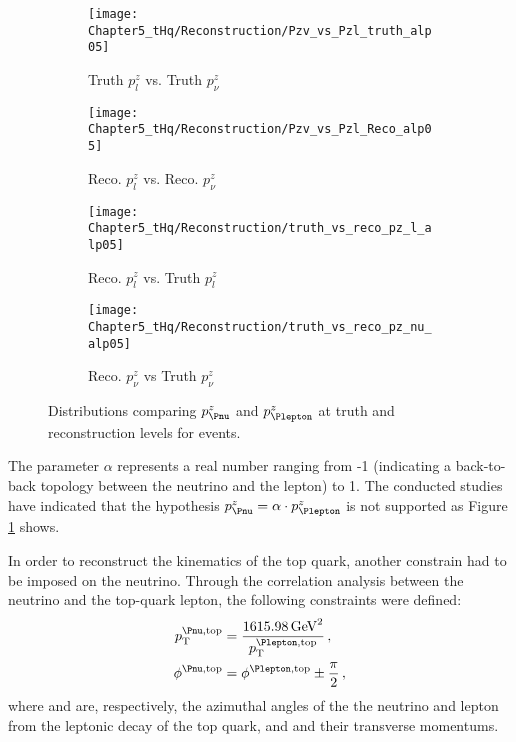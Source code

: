 \begin{figure}  
	\begin{subfigure}{0.45\textwidth}
	\texttt{[image: Chapter5\_tHq/Reconstruction/Pzv\_vs\_Pzl\_truth\_alp05]}
	\caption{Truth $p^z_l$ vs. Truth $p^z_\nu$}
	\label{fig:tHq:EventReconstruction:TopSystem:hypothesis1:A}
	\end{subfigure}
\hfill 
	\begin{subfigure}{0.45\textwidth}
	\texttt{[image: Chapter5\_tHq/Reconstruction/Pzv\_vs\_Pzl\_Reco\_alp05]}
	\caption{Reco. $p^z_l$ vs. Reco. $p^z_\nu$}
	\label{fig:tHq:EventReconstruction:TopSystem:hypothesis1:B	}
	\end{subfigure}

\bigskip  
	\begin{subfigure}{0.45\textwidth}
	\texttt{[image: Chapter5\_tHq/Reconstruction/truth\_vs\_reco\_pz\_l\_alp05]}
	\caption{Reco. $p^z_l$ vs. Truth $p^z_l$}
	\label{fig:tHq:EventReconstruction:TopSystem:hypothesis1:C}
	\end{subfigure}
\hfill 
	\begin{subfigure}{0.45\textwidth}
	\texttt{[image: Chapter5\_tHq/Reconstruction/truth\_vs\_reco\_pz\_nu\_alp05]}
	\caption{Reco. $p^z_\nu$ vs Truth $p^z_\nu$}
	\label{fig:tHq:EventReconstruction:TopSystem:hypothesis1:D}
	\end{subfigure}

\caption{Distributions comparing $p^{z}_{\Pnu}$ and $p^{z}_{\Plepton}$
at truth and reconstruction levels for \tHq \dileptau events.} %
\label{fig:tHq:EventReconstruction:TopSystem:hypothesis1}
\end{figure}

The parameter $\alpha$ represents a real number ranging from -1 (indicating a back-to-back topology between 
the neutrino and the lepton) to 1. %
The conducted studies have indicated that the hypothesis $p^{z}_{\Pnu} = \alpha \cdot p^{z}_{\Plepton}$ is not supported
as Figure \ref{fig:tHq:EventReconstruction:TopSystem:hypothesis1:A} shows. 


In order to reconstruct the kinematics of the top quark, another constrain had to be 
imposed on the neutrino. Through the correlation analysis between the neutrino and 
the top-quark lepton, the following constraints were defined:
\begin{align}
    \pnutopT & =\frac{1615.98\, \text{GeV}^2}{\pltopT}\,,\\
    \phinutop &= \philtop\pm\frac{\pi}{2}\, ,
\end{align}
where \phinutop and \philtop are, respectively, the azimuthal angles of the 
the neutrino and lepton from the leptonic decay of the top quark, and 
\pnutopT and \pltopT their transverse momentums. 

